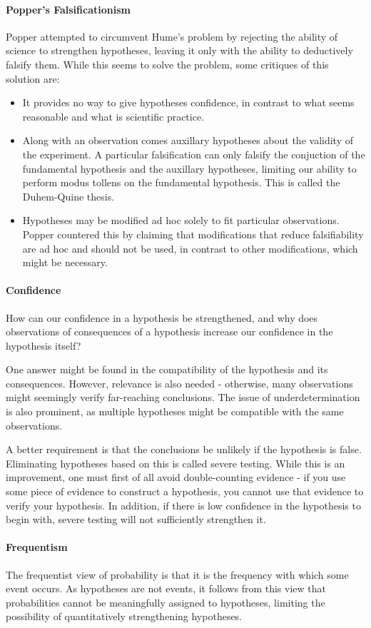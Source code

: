 \paragraph{Popper's Falsificationism}
Popper attempted to circumvent Hume's problem by rejecting the ability of science to strengthen hypotheses, leaving it only with the ability to deductively falsify them. While this seems to solve the problem, some critiques of this solution are:
\begin{itemize}
	\item It provides no way to give hypotheses confidence, in contrast to what seems reasonable and what is scientific practice.
	\item Along with an observation comes auxillary hypotheses about the validity of the experiment. A particular falsification can only falsify the conjuction of the fundamental hypothesis and the auxillary hypotheses, limiting our ability to perform modus tollens on the fundamental hypothesis. This is called the Duhem-Quine thesis.
	\item Hypotheses may be modified ad hoc solely to fit particular observations. Popper countered this by claiming that modifications that reduce falsifiability are ad hoc and should not be used, in contrast to other modifications, which might be necessary.
\end{itemize}

\paragraph{Confidence}
How can our confidence in a hypothesis be strengthened, and why does observations of consequences of a hypothesis increase our confidence in the hypothesis itself?

One answer might be found in the compatibility of the hypothesis and its consequences. However, relevance is also needed - otherwise, many observations might seemingly verify far-reaching conclusions. The issue of underdetermination is also prominent, as multiple hypotheses might be compatible with the same observations.

A better requirement is that the conclusions be unlikely if the hypothesis is false. Eliminating hypotheses based on this is called severe testing. While this is an improvement, one must first of all avoid double-counting evidence - if you use some piece of evidence to construct a hypothesis, you cannot use that evidence to verify your hypothesis. In addition, if there is low confidence in the hypothesis to begin with, severe testing will not sufficiently strengthen it.

\paragraph{Frequentism}
The frequentist view of probability is that it is the frequency with which some event occurs. As hypotheses are not events, it follows from this view that probabilities cannot be meaningfully assigned to hypotheses, limiting the possibility of quantitatively strengthening hypotheses.